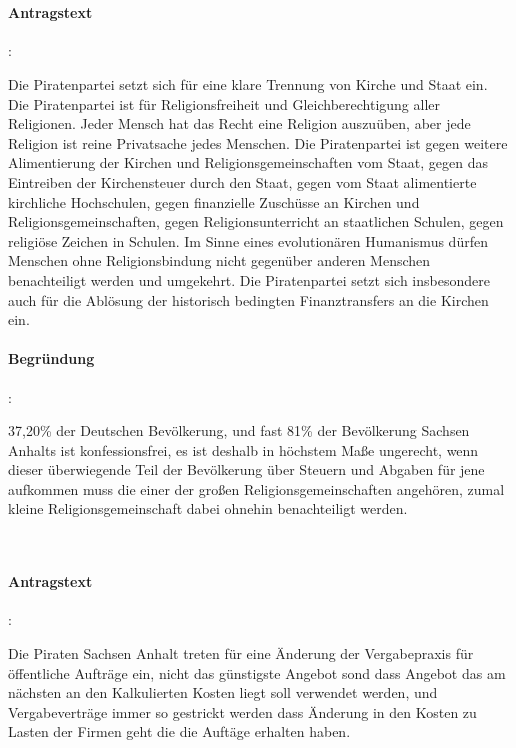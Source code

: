 
\\

\paragraph{Antragstext}:

Die Piratenpartei setzt sich für eine klare Trennung von Kirche und Staat ein. Die Piratenpartei ist für Religionsfreiheit und Gleichberechtigung aller Religionen. Jeder Mensch hat das Recht eine Religion auszuüben, aber jede Religion ist reine Privatsache jedes Menschen. Die Piratenpartei ist gegen weitere Alimentierung der Kirchen und Religionsgemeinschaften vom Staat, gegen das Eintreiben der Kirchensteuer durch den Staat, gegen vom Staat alimentierte kirchliche Hochschulen, gegen finanzielle Zuschüsse an Kirchen und Religionsgemeinschaften, gegen Religionsunterricht an staatlichen Schulen, gegen religiöse Zeichen in Schulen. Im Sinne eines evolutionären Humanismus dürfen Menschen ohne Religionsbindung nicht gegenüber anderen Menschen benachteiligt werden und umgekehrt. Die Piratenpartei setzt sich insbesondere auch für die Ablösung der historisch bedingten Finanztransfers an die Kirchen ein.

\paragraph{Begründung}:

37,20\% der Deutschen Bevölkerung, und fast 81\% der Bevölkerung Sachsen Anhalts ist konfessionsfrei, es ist deshalb in höchstem Maße ungerecht, wenn dieser überwiegende Teil der Bevölkerung über Steuern und Abgaben für jene aufkommen muss die einer der großen Religionsgemeinschaften angehören, zumal kleine Religionsgemeinschaft dabei ohnehin benachteiligt werden.


\\

\paragraph{Antragstext}:

Die Piraten Sachsen Anhalt treten für eine Änderung der Vergabepraxis für öffentliche Aufträge ein, nicht das günstigste Angebot sond dass Angebot das am nächsten an den Kalkulierten Kosten liegt soll verwendet werden, und Vergabeverträge immer so gestrickt werden dass Änderung in den Kosten zu Lasten der Firmen geht die die Auftäge erhalten haben.

